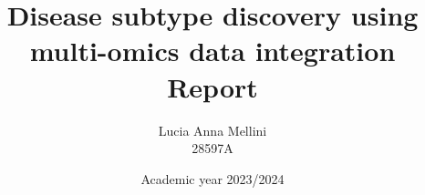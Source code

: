 \documentclass{report}
\begin{document}
\title{\huge{Disease subtype discovery using
multi-omics data integration}\\
\LARGE Report}
\author{Lucia Anna Mellini \\
 28597A}
\date{Academic year 2023/2024}
\maketitle

\tableofcontents







\end{document}
